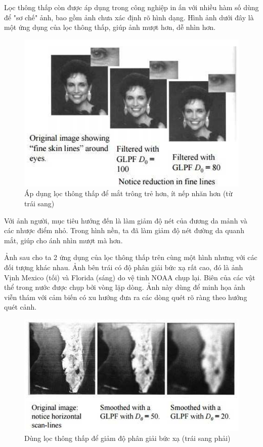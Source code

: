 \documentclass[12pt,a4paper]{report}
\numberwithin{equation}{section}
\theoremstyle{definition} %
\begin{document}
Lọc thông thấp còn được áp dụng trong công nghiệp in ấn với nhiều hàm số dùng để "sơ chế" ảnh, bao gồm ảnh chưa xác định rõ hình dạng. Hình ảnh dưới đây là một ứng dụng của lọc thông thấp, giúp ảnh mượt hơn, dễ nhìn hơn.

\begin{figure}[H]
\centering
\includegraphics[width=0.88\linewidth]{img/ungdungmoanh2.png}
\caption{Áp dụng lọc thông thấp để mắt trông trẻ hơn, ít nếp nhăn hơn (từ trái sang)}
\label{fig125}
\end{figure}

Với ảnh người, mục tiêu hướng đến là làm giảm độ nét của đương da mảnh và các nhược điểm nhỏ. Trong hình nền, ta đã làm giảm độ nét đường da quanh mắt, giúp cho ánh nhìn mượt mà hơn.

Ảnh sau cho ta 2 ứng dụng của lọc thông thấp trên cùng một hình nhưng với các đối tượng khác nhau. Ảnh bên trái có độ phân giải bức xạ rất cao, đó là ảnh Vịnh Mexico (tối) và Florida (sáng) do vệ tinh NOAA chụp lại. Biên của các vật thể trong nước được chụp bởi vòng lặp dòng. Ảnh này dùng để minh họa ảnh viễn thám với cảm biến có xu hướng đưa ra các dòng quét rõ ràng theo hướng quét cảnh.

\begin{figure}[H]
\centering
\includegraphics[width=0.88\linewidth]{img/ungdungmoanh3.png}
\caption{Dùng lọc thông thấp để giảm độ phân giải bức xạ (trái sang phải)}
\label{fig126}
\end{figure}
\end{document}
